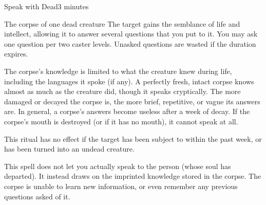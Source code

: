 \begin{spellsection}{Speak with Dead}{3}
\spellrng{\rngclose}
 minutes \dismissable
\begin{spelltarget}{The corpse of one dead creature}
    \spelleffect The target gains the semblance of life and intellect, allowing it to answer several questions that you put to it. You may ask one question per two caster levels. Unasked questions are wasted if the duration expires.

    The corpse's knowledge is limited to what the creature knew during life, including the languages it spoke (if any). A perfectly fresh, intact corpse knows almost as much as the creature did, though it speaks cryptically. The more damaged or decayed the corpse is, the more brief, repetitive, or vague its answers are. In general, a corpse's answers become useless after a week of decay. If the corpse's mouth is destroyed (or if it has no mouth), it cannot speak at all.
\end{spelltarget}

\spellnotes This ritual has no effect if the target has been subject to  within the past week, or has been turned into an undead creature.

\par This spell does not let you actually speak to the person (whose soul has departed). It instead draws on the imprinted knowledge stored in the corpse. The corpse is unable to learn new information, or even remember any previous questions asked of it.
\end{spellsection}

